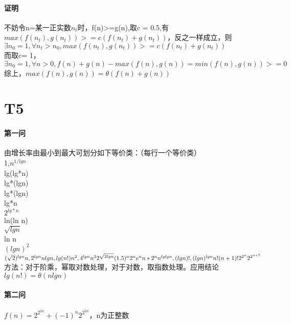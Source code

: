 \documentclass{article}
\begin{document}
\begin{CJK}{UTF8}{gkai}
\paragraph{证明}
不妨令n=某一正实数$n_{t}$时，f(n)>=g(n),取c = 0.5,有$max(f(n_{t}),g(n_{t}))>=c(f(n_{t})+g(n_{t}))$，反之一样成立，则$\exists n_{0} = 1, \forall n_{t} > n_{0},max(f(n_{t}),g(n_{t}))>=c(f(n_{t})+g(n_{t}))$\\
而取c= 1，$\exists n_{0} = 1, \forall n > 0, f(n)+g(n)-max(f(n),g(n)) = min(f(n),g(n)) >= 0$\\
综上，$max(f(n),g(n))=\theta(f(n)+g(n))$
\section{T5} 
\paragraph{第一问}
由增长率由最小到最大可划分如下等价类：（每行一个等价类）\\
1,$n^{1/lgn}$\\
lg(lg*n)\\
lg*(lgn)\\
lg*(lgn)\\
lg*n\\
$2^{lg*n}$\\
ln(ln n)\\
$\sqrt{lgn}$\\
ln n\\
$(lg n)^{2}$\\
$(\sqrt{2})^{lgn}\\
n,2^{lgn}\\
nlgn,lg(n!)\\
n^{2},4^{lgn}\\
n^{3}\\
2^{\sqrt{2lgn}}\\
(1.5)^{n}\\
2^{n}\\
e^{n}\\
n*2^{n}\\
n^{lg lgn},(lg n)!,(lgn)^{lgn}\\
n!\\
(n+1)!\\
2^{2^{n}}\\
2^{2^{n+1}}$\\
方法：对于阶乘，幂取对数处理，对于对数，取指数处理。应用结论$lg(n!)=\theta(nlgn)$\\
\paragraph{第二问}
$f(n) = 2^{2^{2n}} + (-1)^{n}2^{2^{2n}}$，n为正整数
\end{CJK}
\end{document}
